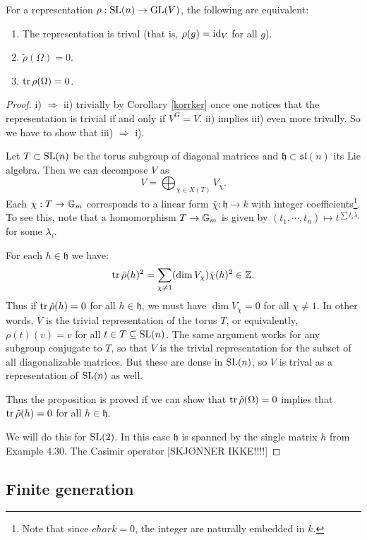 \documentclass[11pt, english]{article}
\begin{document}
\begin{prop}
  For a representation $\rho: \operatorname{SL}(n) \to \operatorname{GL}(V)$, the following are equivalent:
  \begin{enumerate}
  \item The representation is trival (that is, $\rho(g)=\text{id}_V$ for all $g$).
\item $\tilde \rho (\Omega)=0$.
\item $\operatorname{tr} \rho(\Omega) = 0$. 
  \end{enumerate}
\end{prop}
\begin{proof}
i) $\Rightarrow$ ii) trivially by Corollary \ref{korrker} once one notices that the representation is trivial if and only if $V^G=V$. ii) implies iii) even more trivally. So we have to show that iii) $\Rightarrow$ i).

Let $T \subset \operatorname{SL}(n)$ be the torus subgroup of diagonal matrices and $\mathfrak h \subset \mathfrak{sl}(n)$ its Lie algebra. Then we can decompose $V$ as
$$
V = \bigoplus_{\chi \in X(T)} V_\chi.
$$
Each $\chi:T \to \mathbb{G}_m$ corresponds to a linear form $\bar \chi: \mathfrak h \to k$ with integer coefficients\footnote{Note that since $char k=0$, the integer are naturally embedded in $k$.}. To see this, note that a homomorphism $T \to \mathbb{G}_m$ is given by $(t_1,\cdots,t_n) \mapsto t^{\sum t_i\lambda_i}$ for some $\lambda_i$. 

For each $ h \in \mathfrak h$ we have:
\[
\operatorname{tr} \tilde \rho (h)^2 = \sum_{\chi \neq 1} (\dim V_\chi) \bar \chi(h)^2 \in \mathbb{Z}.
\]
Thus if $\operatorname{tr} \tilde \rho (h)=0$ for all $h \in \mathfrak h$, we must have $\dim V_\chi=0$ for all $\chi \neq 1$. In other words, $V$ is the trivial representation of the torus $T$, or equivalently, $\rho(t)(v)=v$ for all $t \in T \subseteq \operatorname{SL}(n)$.  The same argument works for any subgroup conjugate to $T$, so that $V$ is the trivial representation for the subset of all diagonalizable matrices. But these are dense in $\operatorname{SL}(n)$, so $V$ is trival as a representation of $\operatorname{SL}(n)$ as well.

Thus the proposition is proved if we can show that $\operatorname{tr} \tilde \rho (\Omega)=0$ implies that $\operatorname{tr} \tilde \rho(h)=0$ for all $h \in \mathfrak h$. 

We will do this for $\operatorname{SL}(2)$. In this case $\mathfrak h$ is spanned by the single matrix $h$ from Example 4.30. The Casimir operator [SKJØNNER IKKE!!!!]
\end{proof}



\subsection{Finite generation}
\end{document}
